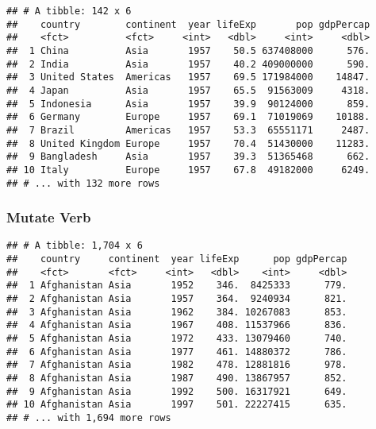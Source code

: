 \documentclass[
]{article}
\newenvironment{Shaded}{\begin{snugshade}}{\end{snugshade}}
\newcommand{\CommentTok}[1]{\textcolor[rgb]{0.56,0.35,0.01}{\textit{#1}}}
\newcommand{\DataTypeTok}[1]{\textcolor[rgb]{0.13,0.29,0.53}{#1}}
\newcommand{\DecValTok}[1]{\textcolor[rgb]{0.00,0.00,0.81}{#1}}
\newcommand{\KeywordTok}[1]{\textcolor[rgb]{0.13,0.29,0.53}{\textbf{#1}}}
\newcommand{\NormalTok}[1]{#1}
\newcommand{\OperatorTok}[1]{\textcolor[rgb]{0.81,0.36,0.00}{\textbf{#1}}}
\newcommand{\StringTok}[1]{\textcolor[rgb]{0.31,0.60,0.02}{#1}}
\begin{document}
\begin{verbatim}
## # A tibble: 142 x 6
##    country        continent  year lifeExp       pop gdpPercap
##    <fct>          <fct>     <int>   <dbl>     <int>     <dbl>
##  1 China          Asia       1957    50.5 637408000      576.
##  2 India          Asia       1957    40.2 409000000      590.
##  3 United States  Americas   1957    69.5 171984000    14847.
##  4 Japan          Asia       1957    65.5  91563009     4318.
##  5 Indonesia      Asia       1957    39.9  90124000      859.
##  6 Germany        Europe     1957    69.1  71019069    10188.
##  7 Brazil         Americas   1957    53.3  65551171     2487.
##  8 United Kingdom Europe     1957    70.4  51430000    11283.
##  9 Bangladesh     Asia       1957    39.3  51365468      662.
## 10 Italy          Europe     1957    67.8  49182000     6249.
## # ... with 132 more rows
\end{verbatim}

\hypertarget{mutate-verb}{%
\subsubsection{Mutate Verb}\label{mutate-verb}}

\begin{Shaded}
\end{Shaded}

\begin{verbatim}
## # A tibble: 1,704 x 6
##    country     continent  year lifeExp      pop gdpPercap
##    <fct>       <fct>     <int>   <dbl>    <int>     <dbl>
##  1 Afghanistan Asia       1952    346.  8425333      779.
##  2 Afghanistan Asia       1957    364.  9240934      821.
##  3 Afghanistan Asia       1962    384. 10267083      853.
##  4 Afghanistan Asia       1967    408. 11537966      836.
##  5 Afghanistan Asia       1972    433. 13079460      740.
##  6 Afghanistan Asia       1977    461. 14880372      786.
##  7 Afghanistan Asia       1982    478. 12881816      978.
##  8 Afghanistan Asia       1987    490. 13867957      852.
##  9 Afghanistan Asia       1992    500. 16317921      649.
## 10 Afghanistan Asia       1997    501. 22227415      635.
## # ... with 1,694 more rows
\end{verbatim}
\end{document}
